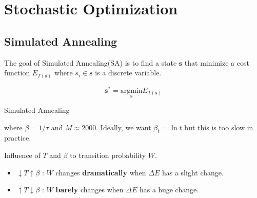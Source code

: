 \chapter{Stochastic Optimization}


\section{Simulated Annealing}
The goal of Simulated Annealing(SA) is to find a state $\boldsymbol{s}$ that minimize  a cost function $E_{T(\boldsymbol{s})}$ where $s_i \in \boldsymbol{s}$ is a discrete variable.

$$
\boldsymbol{s}^* = \underset{\boldsymbol{s}}{\text{argmin}} E_{T(\boldsymbol{s})}
$$

\begin{algorithm}[H]
\caption{Simulated Annealing}
\end{algorithm}

where $\beta = 1 / \tau $ and $M \approx 2000$. Ideally, we want  $\beta_t = \ln t$ but this is too slow in practice.

Influence of $T$ and $\beta$ to transition probability $W$.
\begin{itemize}
	\item $\downarrow T \uparrow  \beta $ : $W$ changes \textbf{dramatically} when $\Delta E$ has a slight change.
	\item $\uparrow T \downarrow  \beta $ : $W$ \textbf{barely} changes  when $\Delta E$ has a huge change.
\end{itemize}

